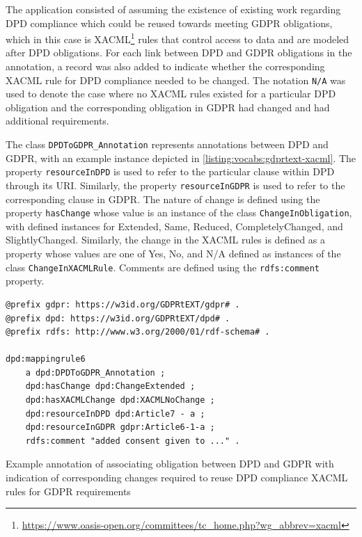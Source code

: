 The application consisted of assuming the existence of existing work regarding DPD compliance which could be reused towards meeting GDPR obligations, which in this case is XACML\footnote{\url{https://www.oasis-open.org/committees/tc_home.php?wg_abbrev=xacml}} rules that control access to data and are modeled after DPD obligations.
For each link between DPD and GDPR obligations in the annotation, a record was also added to indicate whether the corresponding XACML rule for DPD compliance needed to be changed. The notation \texttt{N/A} was used to denote the case where no XACML rules existed for a particular DPD obligation and the corresponding obligation in GDPR had changed and had additional requirements. 

The class \texttt{DPDToGDPR\_Annotation} represents annotations between DPD and GDPR, with an example instance depicted in \autoref{listing:vocabs:gdprtext-xacml}. The property \texttt{resourceInDPD} is used to refer to the particular clause within DPD through its URI. Similarly, the property \texttt{resourceInGDPR} is used to refer to the corresponding clause in GDPR. The nature of change is defined using the property \texttt{hasChange} whose value is an instance of the class \texttt{ChangeInObligation}, with defined instances for Extended, Same, Reduced, CompletelyChanged, and SlightlyChanged. Similarly, the change in the XACML rules is defined as a property whose values are one of Yes, No, and N/A defined as instances of the class \texttt{ChangeInXACMLRule}. Comments are defined using the \texttt{rdfs:comment} property.
\begin{listing}
\begin{verbatim}
@prefix gdpr: https://w3id.org/GDPRtEXT/gdpr# .
@prefix dpd: https://w3id.org/GDPRtEXT/dpd# .
@prefix rdfs: http://www.w3.org/2000/01/rdf-schema# .

dpd:mappingrule6
    a dpd:DPDToGDPR_Annotation ;
    dpd:hasChange dpd:ChangeExtended ;
    dpd:hasXACMLChange dpd:XACMLNoChange ;
    dpd:resourceInDPD dpd:Article7 - a ;
    dpd:resourceInGDPR gdpr:Article6-1-a ;
    rdfs:comment "added consent given to ..." .
\end{verbatim}
\label{listing:vocabs:gdprtext-xacml}
\caption{Example annotation of associating obligation between DPD and GDPR with indication of corresponding changes required to reuse DPD compliance XACML rules for GDPR requirements}
\end{listing}


